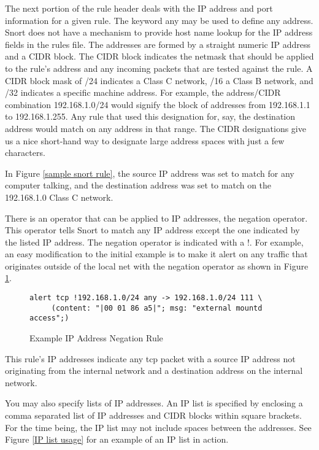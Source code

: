 \documentclass[english]{report}
\begin{document}
The next portion of the rule header deals with the IP address and
port information for a given rule. The keyword any
may be used to define any address. Snort does not have a mechanism
to provide host name lookup for the IP address fields in the rules
file. The addresses are formed by a straight numeric IP address and
a CIDR\cite{CIDRnotation} block. The CIDR block indicates the netmask
that should be applied to the rule's address and any incoming packets
that are tested against the rule. A CIDR block mask of /24 indicates
a Class C network, /16 a Class B network, and /32 indicates a specific
machine address. For example, the address/CIDR combination 192.168.1.0/24
would signify the block of addresses from 192.168.1.1 to 192.168.1.255.
Any rule that used this designation for, say, the destination address
would match on any address in that range. The CIDR designations give
us a nice short-hand way to designate large address spaces with just
a few characters.

In Figure \ref{sample snort rule}, the source IP address was set
to match for any computer talking, and the destination address was
set to match on the 192.168.1.0 Class C network.

There is an operator that can be applied to IP addresses, the negation
operator. This operator tells Snort to match any IP address except
the one indicated by the listed IP address. The negation operator
is indicated with a !. For example, an easy modification
to the initial example is to make it alert on any traffic that originates
outside of the local net with the negation operator as shown in Figure
\ref{Example Negation}.

%
\begin{figure}[!hbpt]
\begin{verbatim}
alert tcp !192.168.1.0/24 any -> 192.168.1.0/24 111 \
     (content: "|00 01 86 a5|"; msg: "external mountd access";)
\end{verbatim}

\caption{\label{Example Negation} Example IP Address Negation Rule}
\end{figure}


This rule's IP addresses indicate any tcp packet with a
source IP address not originating from the internal network and a
destination address on the internal network.

You may also specify lists of IP addresses. An IP list is specified
by enclosing a comma separated list of IP addresses and CIDR blocks
within square brackets. For the time being, the IP list may not include
spaces between the addresses. See Figure \ref{IP list usage} for
an example of an IP list in action.
\end{document}

